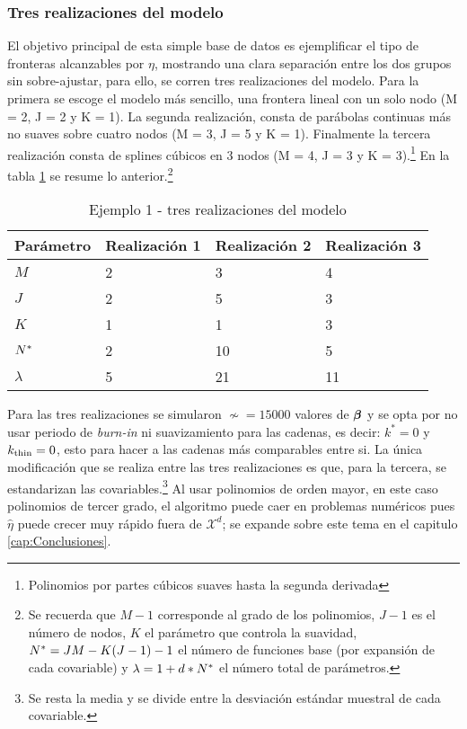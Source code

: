 \documentclass[../Main/Main.tex]{subfiles}
\begin{document}
\subsubsection*{Tres realizaciones del modelo}
El objetivo principal de esta simple base de datos es ejemplificar el tipo de fronteras alcanzables por $\eta$, mostrando una clara separación entre los dos grupos sin sobre-ajustar, para ello, se corren tres realizaciones del modelo. Para la primera se escoge el modelo más sencillo, una frontera lineal con un solo nodo (M = 2, J = 2 y K = 1). La segunda realización, consta de parábolas continuas más no suaves sobre cuatro nodos (M = 3, J = 5 y K = 1). Finalmente la tercera realización consta de splines cúbicos en 3 nodos (M = 4, J = 3 y K = 3).\footnote{Polinomios por partes cúbicos suaves hasta la segunda derivada} En la tabla \ref{tab:Ejemplo1Modelos} se resume lo anterior.\footnote{Se recuerda que $M-1$ corresponde al grado de los polinomios, $J-1$ es el número de nodos, $K$ el parámetro que controla la suavidad, $N^* = JM - K(J-1) - 1$ el número de funciones base (por expansión de cada covariable) y $\lambda = 1 + d*N^*$ el número total de parámetros.}
\begin{table}[H]
\centering
\begin{tabular}{l|lll}
\hline
Parámetro & Realización 1 & Realización 2 & Realización 3 \\ \hline\hline
$M$       & 2        & 3        & 4        \\ \hline
$J$       & 2        & 5        & 3        \\ \hline
$K$       & 1        & 1        & 3        \\ \hline\hline
$N^*$      & 2        & 10       & 5        \\ \hline
$\lambda$ & 5        & 21       & 11       \\ \hline
\end{tabular}
\caption{Ejemplo 1 - tres realizaciones del modelo}
\label{tab:Ejemplo1Modelos}
\end{table}
Para las tres realizaciones se simularon $\nsim = \num{15000}$ valores de $\bm{\beta}$ y se opta por no usar periodo de \textit{burn-in} ni suavizamiento para las cadenas, es decir: $k^* = 0$ y $k_{\text{thin}} = 0$, esto para hacer a las cadenas más comparables entre si. La única modificación que se realiza entre las tres realizaciones es que, para la tercera, se estandarizan las covariables.\footnote{Se resta la media y se divide entre la desviación estándar muestral de cada covariable.} Al usar polinomios de orden mayor, en este caso polinomios de tercer grado, el algoritmo puede caer en problemas numéricos pues $\hat{\eta}$ puede crecer muy rápido fuera de $\mathcal{X}^d$; se expande sobre este tema en el capitulo \ref{cap:Conclusiones}. 
\end{document}
